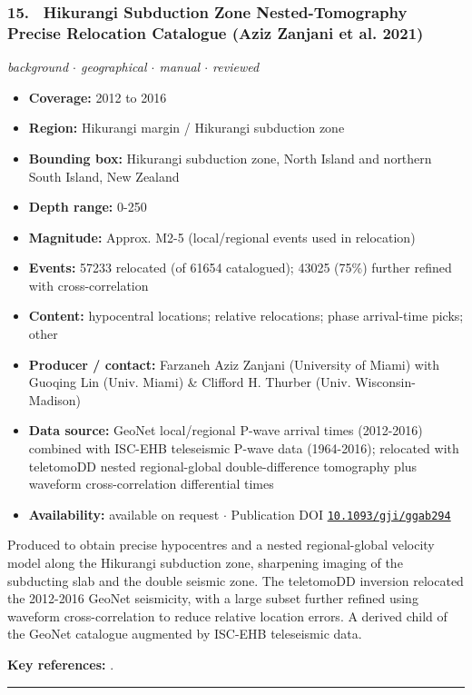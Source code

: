 \documentclass[10pt,a4paper]{article}
\newcommand{\catentryrule}{\par\vspace{3pt}\noindent\textcolor{rulegrey}{\rule{\linewidth}{0.3pt}}\par\vspace{5pt}}
\newcommand{\kv}[2]{\item \textbf{#1:} #2}
\begin{document}
\subsubsection*{\hypertarget{c:15}{15.}~ Hikurangi Subduction Zone Nested-Tomography Precise Relocation Catalogue (Aziz Zanjani et al. 2021)}
{\small\itshape background $\cdot$ geographical $\cdot$ manual $\cdot$ reviewed}\par\vspace{2pt}
\begin{itemize}[leftmargin=1.3em,itemsep=0.6pt,topsep=1pt,parsep=0pt]
\kv{Coverage}{2012 to 2016}
\kv{Region}{Hikurangi margin / Hikurangi subduction zone}
\kv{Bounding box}{Hikurangi subduction zone, North Island and northern South Island, New Zealand}
\kv{Depth range}{0-250}
\kv{Magnitude}{Approx. M2-5 (local/regional events used in relocation)}
\kv{Events}{57233 relocated (of 61654 catalogued); 43025 (75\%) further refined with cross-correlation}
\kv{Content}{hypocentral locations; relative relocations; phase arrival-time picks; other}
\kv{Producer / contact}{Farzaneh Aziz Zanjani (University of Miami) with Guoqing Lin (Univ. Miami) \& Clifford H. Thurber (Univ. Wisconsin-Madison)}
\kv{Data source}{GeoNet local/regional P-wave arrival times (2012-2016) combined with ISC-EHB teleseismic P-wave data (1964-2016); relocated with teletomoDD nested regional-global double-difference tomography plus waveform cross-correlation differential times}
\kv{Availability}{available on request $\cdot$ Publication DOI \href{https://doi.org/10.1093/gji/ggab294}{\nolinkurl{10.1093/gji/ggab294}}}
\end{itemize}
\par\vspace{2pt}Produced to obtain precise hypocentres and a nested regional-global velocity model along the Hikurangi subduction zone, sharpening imaging of the subducting slab and the double seismic zone. The teletomoDD inversion relocated the 2012-2016 GeoNet seismicity, with a large subset further refined using waveform cross-correlation to reduce relative location errors. A derived child of the GeoNet catalogue augmented by ISC-EHB teleseismic data.
\par\vspace{2pt}\textbf{Key references:} \cite{AzizZanjani2021}.
\catentryrule
\end{document}
